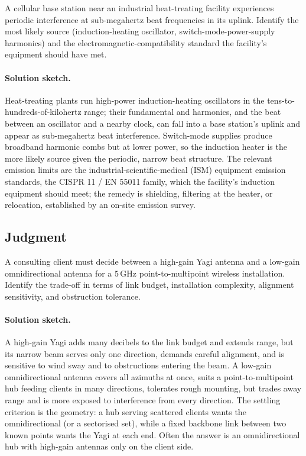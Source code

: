\begin{exercise}
A cellular base station near an industrial heat-treating facility
experiences periodic interference at sub-megahertz beat frequencies
in its uplink. Identify the most likely source (induction-heating
oscillator, switch-mode-power-supply harmonics) and the
electromagnetic-compatibility standard the facility's equipment
should have met.
\paragraph{Solution sketch.} Heat-treating plants run high-power
induction-heating oscillators in the tens-to-hundreds-of-kilohertz
range; their fundamental and harmonics, and the beat between an
oscillator and a nearby clock, can fall into a base station's uplink and
appear as sub-megahertz beat interference. Switch-mode supplies produce
broadband harmonic combs but at lower power, so the induction heater is
the more likely source given the periodic, narrow beat structure. The
relevant emission limits are the industrial-scientific-medical (ISM)
equipment emission standards, the CISPR 11 / EN 55011 family, which the
facility's induction equipment should meet; the remedy is shielding,
filtering at the heater, or relocation, established by an on-site
emission survey.
\end{exercise}

\subsection*{Judgment}

\begin{exercise}
A consulting client must decide between a high-gain Yagi antenna and
a low-gain omnidirectional antenna for a $5\,\si{\giga\hertz}$
point-to-multipoint wireless installation. Identify the trade-off in
terms of link budget, installation complexity, alignment sensitivity,
and obstruction tolerance.
\paragraph{Solution sketch.} A high-gain Yagi adds many decibels to the
link budget and extends range, but its narrow beam serves only one
direction, demands careful alignment, and is sensitive to wind sway and
to obstructions entering the beam. A low-gain omnidirectional antenna
covers all azimuths at once, suits a point-to-multipoint hub feeding
clients in many directions, tolerates rough mounting, but trades away
range and is more exposed to interference from every direction. The
settling criterion is the geometry: a hub serving scattered clients
wants the omnidirectional (or a sectorised set), while a fixed
backbone link between two known points wants the Yagi at each end. Often
the answer is an omnidirectional hub with high-gain antennas only on the
client side.
\end{exercise}

